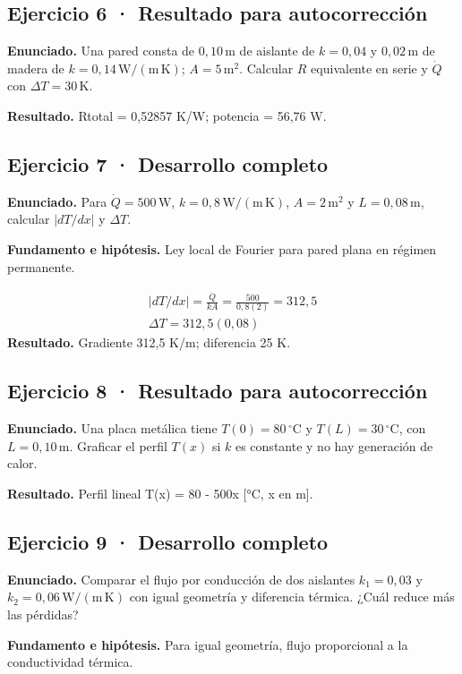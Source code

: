 \documentclass[11pt,a4paper]{article}
\begin{document}
\subsection*{Ejercicio 6 · Resultado para autocorrección}
\textbf{Enunciado.} Una pared consta de \(0{,}10\,\mathrm m\) de aislante de \(k=0{,}04\) y \(0{,}02\,\mathrm m\) de madera de \(k=0{,}14\,\mathrm{W/(m\,K)}\); \(A=5\,\mathrm m^2\). Calcular \(R\) equivalente en serie y \(\dot Q\) con \(\Delta T=30\,\mathrm K\).

\textbf{Resultado.} Rtotal = 0,52857 K/W; potencia = 56,76 W.


\subsection*{Ejercicio 7 · Desarrollo completo}
\textbf{Enunciado.} Para \(\dot Q=500\,\mathrm W\), \(k=0{,}8\,\mathrm{W/(m\,K)}\), \(A=2\,\mathrm m^2\) y \(L=0{,}08\,\mathrm m\), calcular \(|dT/dx|\) y \(\Delta T\).

\textbf{Fundamento e hipótesis.} Ley local de Fourier para pared plana en régimen permanente.

\[
\begin{gathered}
|dT/dx|=\frac{\dot Q}{kA}=\frac{500}{0{,}8(2)}=312{,}5\\\Delta T=312{,}5(0{,}08)
\end{gathered}
\]
\textbf{Resultado.} Gradiente 312,5 K/m; diferencia 25 K.


\subsection*{Ejercicio 8 · Resultado para autocorrección}
\textbf{Enunciado.} Una placa metálica tiene \(T(0)=80\,^\circ\mathrm C\) y \(T(L)=30\,^\circ\mathrm C\), con \(L=0{,}10\,\mathrm m\). Graficar el perfil \(T(x)\) si \(k\) es constante y no hay generación de calor.

\textbf{Resultado.} Perfil lineal T(x) = 80 - 500x [°C, x en m].


\subsection*{Ejercicio 9 · Desarrollo completo}
\textbf{Enunciado.} Comparar el flujo por conducción de dos aislantes \(k_1=0{,}03\) y \(k_2=0{,}06\,\mathrm{W/(m\,K)}\) con igual geometría y diferencia térmica. ¿Cuál reduce más las pérdidas?

\textbf{Fundamento e hipótesis.} Para igual geometría, flujo proporcional a la conductividad térmica.
\end{document}
